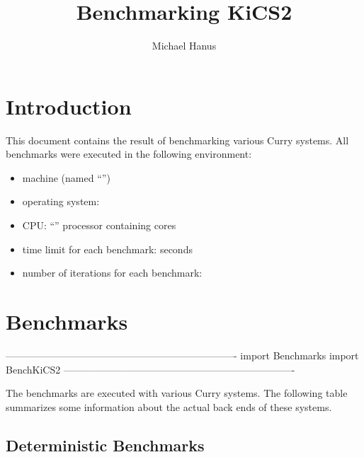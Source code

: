 \documentclass{scrartcl}
\begin{document}
\sloppy

\title{Benchmarking KiCS2}
\author{Michael Hanus}
\maketitle

\section{Introduction}

This document contains the result of benchmarking various
Curry systems.
%
All benchmarks were executed in the following environment:
\begin{itemize}
\item {} machine (named ``'')
\item operating system:  
\item CPU: ``'' processor containing
       cores
\item time limit for each benchmark:  seconds
\item number of iterations for each benchmark:
\end{itemize}
     
\section{Benchmarks}

\begin{curryprog}
----------------------------------------------------------------------
import Benchmarks
import BenchKiCS2
----------------------------------------------------------------------
\end{curryprog}

The benchmarks are executed with various Curry systems.
The following table summarizes some information about the
actual back ends of these systems.

\begin{center}
\end{center}

\subsection{Deterministic Benchmarks}
\end{document}
